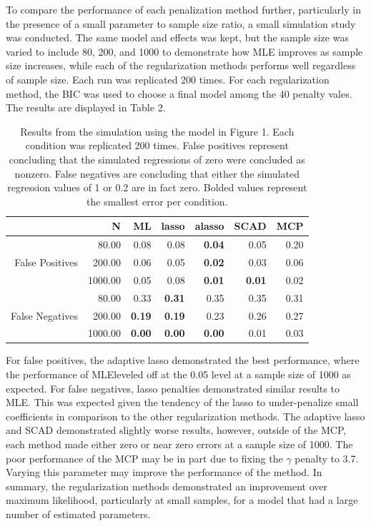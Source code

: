 To compare the performance of each penalization method further,
particularly in the presence of a small parameter to sample size ratio,
a small simulation study was conducted. The same model and effects was
kept, but the sample size was varied to include 80, 200, and 1000 to
demonstrate how MLE improves as sample size increases, while each of the
regularization methods performs well regardless of sample size. Each run
was replicated 200 times. For each regularization method, the BIC was
used to choose a final model among the 40 penalty vales. The results are
displayed in Table 2.

\begin{table}[ht]
\centering
\begin{tabular}{rrrrrrr}
  \hline
 & N & ML & lasso & alasso & SCAD & MCP \\ 
  \hline
 & 80.00 & 0.08 & 0.08 & \textbf{0.04} & 0.05 & 0.20 \\ 
  False Positives & 200.00 & 0.06 & 0.05 & \textbf{0.02} & 0.03 & 0.06 \\ 
   & 1000.00 & 0.05 & 0.08 & \textbf{0.01} & \textbf{0.01} & 0.02 \\ 
   & 80.00 & 0.33 & \textbf{0.31} & 0.35 & 0.35 & 0.31 \\ 
  False Negatives & 200.00 & \textbf{0.19} & \textbf{0.19} & 0.23 & 0.26 & 0.27 \\ 
   & 1000.00 & \textbf{0.00} & \textbf{0.00} & \textbf{0.00} & 0.01 & 0.03 \\ 
   \hline
\end{tabular}
    \caption{Results from the simulation using the model in Figure 1. Each condition was replicated 200 times. False positives represent concluding that the simulated regressions of zero were concluded as nonzero. False negatives are concluding that either the simulated regression values of 1 or 0.2 are in fact zero. Bolded values represent the smallest error per condition.}
\end{table}

For false positives, the adaptive lasso demonstrated the best
performance, where the performance of MLEleveled off at the 0.05 level
at a sample size of 1000 as expected. For false negatives, lasso
penalties demonstrated similar results to MLE. This was expected given
the tendency of the lasso to under-penalize small coefficients in
comparison to the other regularization methods. The adaptive lasso and
SCAD demonstrated slightly worse results, however, outside of the MCP,
each method made either zero or near zero errors at a sample size of
1000. The poor performance of the MCP may be in part due to fixing the
\(\gamma\) penalty to 3.7. Varying this parameter may improve the
performance of the method. In summary, the regularization methods
demonstrated an improvement over maximum likelihood, particularly at
small samples, for a model that had a large number of estimated
parameters.


